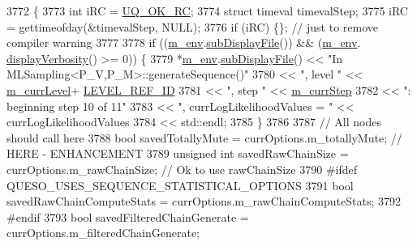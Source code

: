\begin{DoxyCode}
3772 \{
3773   \textcolor{keywordtype}{int} iRC = \hyperlink{namespace_q_u_e_s_o_a8e909502900aecf24cedba022ea84471}{UQ\_OK\_RC};
3774   \textcolor{keyword}{struct }timeval timevalStep;
3775   iRC = gettimeofday(&timevalStep, NULL);
3776   \textcolor{keywordflow}{if} (iRC) \{\}; \textcolor{comment}{// just to remove compiler warning}
3777 
3778       \textcolor{keywordflow}{if} ((\hyperlink{class_q_u_e_s_o_1_1_m_l_sampling_a13f1ca4fe9f94822fe572a743eaced1d}{m\_env}.\hyperlink{class_q_u_e_s_o_1_1_base_environment_a8a0064746ae8dddfece4229b9ad374d6}{subDisplayFile}()) && (\hyperlink{class_q_u_e_s_o_1_1_m_l_sampling_a13f1ca4fe9f94822fe572a743eaced1d}{m\_env}.
      \hyperlink{class_q_u_e_s_o_1_1_base_environment_a1fe5f244fc0316a0ab3e37463f108b96}{displayVerbosity}() >= 0)) \{
3779         *\hyperlink{class_q_u_e_s_o_1_1_m_l_sampling_a13f1ca4fe9f94822fe572a743eaced1d}{m\_env}.\hyperlink{class_q_u_e_s_o_1_1_base_environment_a8a0064746ae8dddfece4229b9ad374d6}{subDisplayFile}() << \textcolor{stringliteral}{"In MLSampling<P\_V,P\_M>::generateSequence()"}
3780                                 << \textcolor{stringliteral}{", level "} << \hyperlink{class_q_u_e_s_o_1_1_m_l_sampling_af9416874c856e50f3b35270e801f17e4}{m\_currLevel}+
      \hyperlink{_m_l_sampling_level_options_8h_a68d15eaf394d210effcf584b938206d3}{LEVEL\_REF\_ID}
3781                                 << \textcolor{stringliteral}{", step "}  << \hyperlink{class_q_u_e_s_o_1_1_m_l_sampling_a1b1f8ccb4823bdfa26ec652f0807c63e}{m\_currStep}
3782                                 << \textcolor{stringliteral}{": beginning step 10 of 11"}
3783                                 << \textcolor{stringliteral}{", currLogLikelihoodValues = "} << currLogLikelihoodValues
3784                                 << std::endl;
3785       \}
3786 
3787       \textcolor{comment}{// All nodes should call here}
3788       \textcolor{keywordtype}{bool}         savedTotallyMute           = currOptions.m\_totallyMute; \textcolor{comment}{// HERE - ENHANCEMENT}
3789       \textcolor{keywordtype}{unsigned} \textcolor{keywordtype}{int} savedRawChainSize          = currOptions.m\_rawChainSize; \textcolor{comment}{// Ok to use rawChainSize}
3790 \textcolor{preprocessor}{#ifdef QUESO\_USES\_SEQUENCE\_STATISTICAL\_OPTIONS}
3791 \textcolor{preprocessor}{}      \textcolor{keywordtype}{bool}         savedRawChainComputeStats  = currOptions.m\_rawChainComputeStats;
3792 \textcolor{preprocessor}{#endif}
3793 \textcolor{preprocessor}{}      \textcolor{keywordtype}{bool}         savedFilteredChainGenerate = currOptions.m\_filteredChainGenerate;

\end{DoxyCode}
